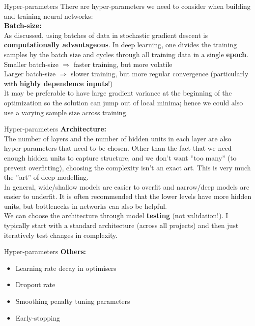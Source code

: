 \documentclass{beamer}
\begin{document}
\begin{frame}{Hyper-parameters}
There are hyper-parameters we need to consider when building and training neural networks:\\
\textbf{Batch-size:}\\
As discussed, using batches of data in stochastic gradient descent is \textbf{computationally advantageous}. In deep learning, one divides the training samples by the batch size and cycles through all training data in a single \textbf{epoch}.\\
Smaller batch-size $\Rightarrow$ faster training, but more volatile\\
Larger batch-size $\Rightarrow$ slower training, but more regular convergence (particularly with \textbf{highly dependence inputs}!)\\
It may be preferable to have large gradient variance at the beginning of the optimization so the solution can jump out of local minima; hence we could also use a varying sample size across training.
\end{frame}

\begin{frame}{Hyper-parameters}
\textbf{Architecture:}\\
The number of layers and the number of hidden units in each layer are also hyper-parameters that need to be chosen. Other than the fact that we need enough hidden units to capture structure, and we don't want ''too many'' (to prevent overfitting), choosing the complexity isn't an exact art. This is very much the ''art'' of deep modelling.\\

In general, wide/shallow models are easier to overfit and narrow/deep models are easier to underfit. It is often recommended that the lower levels have more hidden units, but bottlenecks in networks can also be helpful.\\
We can choose the architecture through model \textbf{testing} (not validation!). I typically start with a standard architecture (across all projects) and then just iteratively test changes in complexity.
\end{frame}
\begin{frame}{Hyper-parameters}
\textbf{Others:}\\
\begin{itemize}
\item Learning rate decay in optimisers
\item Dropout rate
\item Smoothing penalty tuning parameters
\item Early-stopping
\end{itemize}
\end{frame}
\end{document}
